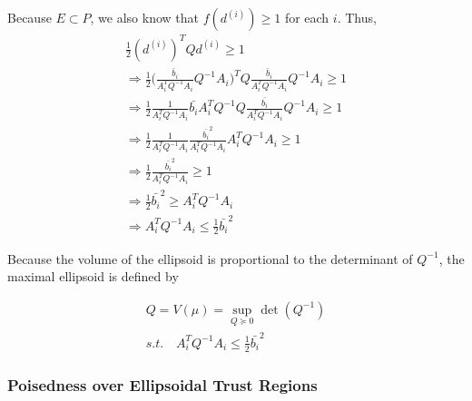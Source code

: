 Because $E \subset P$, we also know that $f(d^{(i)}) \ge 1$ for each $i$. Thus,
\begin{align*}
\frac 1 2 (d^{(i)})^{T} Q d^{(i)} \ge 1 \\
\Longrightarrow \frac 1 2 \bigg(\frac {\bar{b}_i}{A_i^T  Q^{-1}A_i}  Q^{-1}A_i\bigg)^{T} Q \frac {\bar{b}_i}{A_i^T  Q^{-1}A_i}  Q^{-1}A_i \ge 1 \\
\Longrightarrow \frac 1 2 \frac {1}{A_i^T  Q^{-1}A_i}  \bar{b_i} A_i^T Q^{-1} Q \frac {\bar{b_i}}{A_i^T  Q^{-1}A_i}  Q^{-1}A_i \ge 1 \\
\Longrightarrow \frac 1 2 \frac {1}{A_i^T  Q^{-1}A_i}  \frac {\bar{b_i}^2}{A_i^T  Q^{-1}A_i}  A_i^T Q^{-1}A_i \ge 1 \\
\Longrightarrow \frac 1 2  \frac {\bar{b_i}^2}{A_i^T  Q^{-1}A_i} \ge 1 \\
\Longrightarrow \frac 1 2 \bar{b_i}^2\ge A_i^T  Q^{-1}A_i \\
\Longrightarrow A_i^T  Q^{-1}A_i \le \frac 1 2 \bar{b_i}^2
\end{align*}

Because the volume of the ellipsoid is proportional to the determinant of $Q^{-1}$, the maximal ellipsoid is defined by

\begin{align*}
Q = V(\mu) = \sup_{Q \succeq 0} \det(Q^{-1}) \\
s.t. \quad A_i^T Q^{-1} A_i \le \frac 1 2 \bar{b_i}^2
\end{align*}


% 
% 


\subsubsection{Poisedness over Ellipsoidal Trust Regions}
\label{ellipsoidal_lambda}

